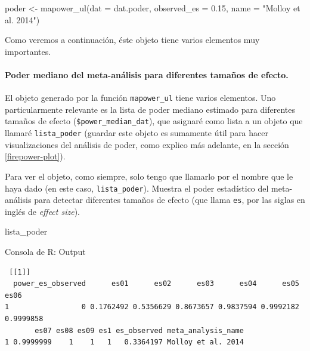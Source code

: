 \documentclass[
  bookmarksnumbered]{article}
\newenvironment{Shaded}{\begin{snugshade}}{\end{snugshade}}
\newcommand{\AttributeTok}[1]{\textcolor[rgb]{0.00,0.34,0.68}{#1}}
\newcommand{\FloatTok}[1]{\textcolor[rgb]{0.69,0.50,0.00}{#1}}
\newcommand{\FunctionTok}[1]{\textcolor[rgb]{0.39,0.29,0.61}{#1}}
\newcommand{\NormalTok}[1]{\textcolor[rgb]{0.12,0.11,0.11}{#1}}
\newcommand{\OtherTok}[1]{\textcolor[rgb]{0.00,0.43,0.16}{#1}}
\newcommand{\SpecialCharTok}[1]{\textcolor[rgb]{0.24,0.68,0.91}{#1}}
\newcommand{\StringTok}[1]{\textcolor[rgb]{0.75,0.01,0.01}{#1}}
\begin{document}
\begin{Shaded}
\begin{Highlighting}[]
\NormalTok{poder }\OtherTok{\textless{}{-}} \FunctionTok{mapower\_ul}\NormalTok{(}\AttributeTok{dat =}\NormalTok{ dat.poder, }\AttributeTok{observed\_es =} \FloatTok{0.15}\NormalTok{, }\AttributeTok{name =} \StringTok{"Molloy et al. 2014"}\NormalTok{)}
\end{Highlighting}
\end{Shaded}

Como veremos a continuación, éste objeto tiene varios elementos muy importantes.

\hypertarget{poder-mediano}{%
\paragraph{Poder mediano del meta-análisis para diferentes tamaños de efecto.}\label{poder-mediano}}

El objeto generado por la función \texttt{mapower\_ul} tiene varios elementos. Uno particularmente relevante es la lista de poder mediano estimado para diferentes tamaños de efecto (\texttt{\$power\_median\_dat}), que asignaré como lista a un objeto que llamaré \texttt{lista\_poder} (guardar este objeto es sumamente útil para hacer visualizaciones del análisis de poder, como explico más adelante, en la sección \ref{firepower-plot}).

\begin{Shaded}
\end{Shaded}

Para ver el objeto, como siempre, solo tengo que llamarlo por el nombre que le haya dado (en este caso, \texttt{lista\_poder}). Muestra el poder estadístico del meta-análisis para detectar diferentes tamaños de efecto (que llama \texttt{es}, por las siglas en inglés de \emph{effect size}).

\begin{Shaded}
\begin{Highlighting}[]
\NormalTok{lista\_poder}
\end{Highlighting}
\end{Shaded}

\begin{ROut}{Consola de R: Output~\thetcbcounter}
                \begin{footnotesize}
                \begin{verbatim} [[1]]
  power_es_observed      es01      es02      es03      es04      es05      es06
1                 0 0.1762492 0.5356629 0.8673657 0.9837594 0.9992182 0.9999858
       es07 es08 es09 es1 es_observed meta_analysis_name
1 0.9999999    1    1   1   0.3364197 Molloy et al. 2014
 \end{verbatim}
                \end{footnotesize}
                \end{ROut}
\end{document}
